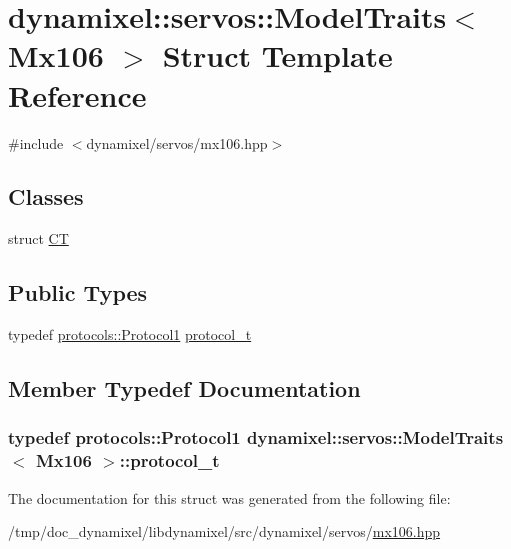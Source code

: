 \hypertarget{structdynamixel_1_1servos_1_1_model_traits_3_01_mx106_01_4}{}\section{dynamixel\+:\+:servos\+:\+:Model\+Traits$<$ Mx106 $>$ Struct Template Reference}
\label{structdynamixel_1_1servos_1_1_model_traits_3_01_mx106_01_4}


{\ttfamily \#include $<$dynamixel/servos/mx106.\+hpp$>$}

\subsection*{Classes}
\begin{DoxyCompactItemize}
\item 
struct \hyperlink{structdynamixel_1_1servos_1_1_model_traits_3_01_mx106_01_4_1_1_c_t}{CT}
\end{DoxyCompactItemize}
\subsection*{Public Types}
\begin{DoxyCompactItemize}
\item 
typedef \hyperlink{classdynamixel_1_1protocols_1_1_protocol1}{protocols\+::\+Protocol1} \hyperlink{structdynamixel_1_1servos_1_1_model_traits_3_01_mx106_01_4_a9c0caba66e8188713393008944bcf173}{protocol\+\_\+t}
\end{DoxyCompactItemize}


\subsection{Member Typedef Documentation}
\subsubsection[{\texorpdfstring{protocol\+\_\+t}{protocol_t}}]{\setlength{\rightskip}{0pt plus 5cm}typedef {\bf protocols\+::\+Protocol1} {\bf dynamixel\+::servos\+::\+Model\+Traits}$<$ {\bf Mx106} $>$\+::{\bf protocol\+\_\+t}}\hypertarget{structdynamixel_1_1servos_1_1_model_traits_3_01_mx106_01_4_a9c0caba66e8188713393008944bcf173}{}\label{structdynamixel_1_1servos_1_1_model_traits_3_01_mx106_01_4_a9c0caba66e8188713393008944bcf173}


The documentation for this struct was generated from the following file\+:\begin{DoxyCompactItemize}
\item 
/tmp/doc\+\_\+dynamixel/libdynamixel/src/dynamixel/servos/\hyperlink{mx106_8hpp}{mx106.\+hpp}\end{DoxyCompactItemize}
